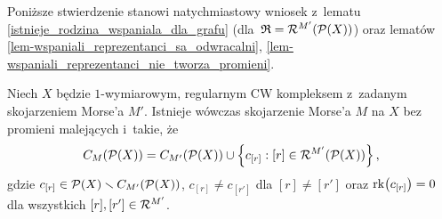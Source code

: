 Poniższe stwierdzenie stanowi natychmiastowy wniosek z~lematu \ref{istnieje_rodzina_wspaniala_dla_grafu} (dla~$\mathfrak{R}=\mathcal{R}^{M'}(\mathcal{P}(X))$) oraz lematów \ref{lem-wspaniali_reprezentanci_sa_odwracalni}, \ref{lem-wspaniali_reprezentanci_nie_tworza_promieni}.

\begin{stw}\label{reversing_stw2}
Niech $X$ będzie $1$-wymiarowym, regularnym CW kompleksem z~zadanym skojarzeniem Morse'a $M'$. Istnieje wówczas skojarzenie Morse'a $M$ na $X$ bez promieni malejących i~takie, że \[C_M(\mathcal{P}(X))=C_{M'}(\mathcal{P}(X))\cup\left\{c_{[r]}:[r]\in\mathcal{R}^{M'}(\mathcal{P}(X))\right\},\] gdzie $c_{[r]}\in\mathcal{P}(X)\smallsetminus C_{M'}(\mathcal{P}(X))$, $c_{[r]}\not=c_{[r']}$ dla $[r]\not=[r']$ oraz $\operatorname{rk}\bigl(c_{[r]}\bigr)=0$ dla wszystkich $[r],[r']\in\mathcal{R}^{M'}$.
\end{stw}

\begin{comment}
Przydatna okaże się również możliwość ,,odwrócenia'' promienia rosnącego kosztem utworzenia promienia malejącego i~elementu krytycznego. Ponieważ odwracanie promieni rosnących ma dla niniejszej rozprawy mniejsze znaczenie niż odwracanie promieni malejących, nie będziemy tworzyć narzędzi w~rodzaju lematów \ref{lem-wspaniali_reprezentanci_sa_odwracalni}, \ref{lem-wspaniali_reprezentanci_nie_tworza_promieni}. Udowodnimy jedynie twierdzenie pozwalające na odwrócenie pojedynczego promienia rosnącego. Wprowadźmy jednak najpierw kilka definicji.

Jeżeli $r=(r_i)_i\in\mN$~oraz $s=(s_i)_i\in\mN$ są promieniami rosnącymi w~pewnym grafie skierowanym $D$,to mówimy, że promienie te są \textit{równoważne}, jeśli $s_i=r_i$ dla wszystkich odpowiednio dużych $i\in\mN$. 

Dla skojarzenia Morse'a $M$~na częściowym porządku $P$~symbolem \reflectbox{$\mcR$}$_M(P)$ będziemy oznaczać zbiór klas równoważności promieni rosnących zawartych w~grafie skierowanym $\mH_M(P)$.

Możemy teraz przejść do sformułowania wspomnianego twierdzenia.

\begin{tw}
Niech $M'$~będzie skojarzeniem Morse'a na częściowym porządku z~rangą $P$~o~tej własności, że $(r_i)_{i\in\mN}$ jest promieniem rosnącym w~$\mH_{M'}(P)$, zbiór \reflectbox{$\mcR$}$_{M'}(P)$ jest jednoelementowy. Istnieje wówczas skojarzenie Morse'a $M$~na $P$~takie, że \reflectbox{$\mcR$}$_{M}(P)=\emptyset$ oraz $\mcC_{M}(P)=\mcC_{M'}(P)\cup\{r_1\}$  
\end{tw}
\end{comment}

